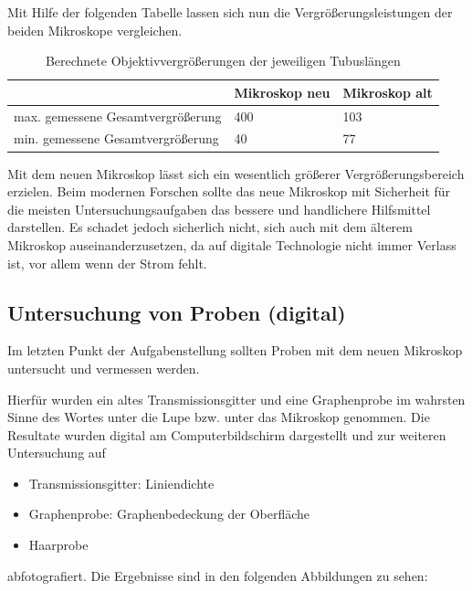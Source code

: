\documentclass[12pt,a4paper,twoside]{article}
\begin{document}
\noindent
Mit Hilfe der folgenden Tabelle lassen sich nun die Vergrößerungsleistungen der beiden Mikroskope vergleichen.

\begin{table}[H]
    \centering
    \caption{Berechnete Objektivvergrößerungen der jeweiligen Tubuslängen}
    \label{tab:Okularvergrößerungen}
    \begin{tabular}{| l | l | l |}
        \hline
           & Mikroskop neu & Mikroskop alt \\
        \hline
        max. gemessene Gesamtvergrößerung & 400 & 103 \\
        min. gemessene Gesamtvergrößerung & 40 & 77 \\
        \hline
    \end{tabular}
\end{table}

\noindent
Mit dem neuen Mikroskop lässt sich ein wesentlich größerer Vergrößerungsbereich erzielen. 
Beim modernen Forschen sollte das neue Mikroskop mit Sicherheit für die meisten Untersuchungsaufgaben das bessere und handlichere Hilfsmittel darstellen.
Es schadet jedoch sicherlich nicht, sich auch mit dem älterem Mikroskop auseinanderzusetzen, da auf digitale Technologie nicht immer Verlass ist, vor allem wenn der Strom fehlt.


\subsection{Untersuchung von Proben (digital)}

Im letzten Punkt der Aufgabenstellung sollten Proben mit dem neuen Mikroskop untersucht und vermessen werden. \newline

\noindent
Hierfür wurden ein altes Transmissionsgitter und eine Graphenprobe im wahrsten Sinne des Wortes unter die Lupe bzw. unter das Mikroskop genommen.
Die Resultate wurden digital am Computerbildschirm dargestellt und zur weiteren Untersuchung auf

\begin{itemize}
    \item Transmissionsgitter: Liniendichte
    \item Graphenprobe: Graphenbedeckung der Oberfläche
    \item Haarprobe 
\end{itemize}

\noindent
abfotografiert. Die Ergebnisse sind in den folgenden Abbildungen zu sehen:
\end{document}
